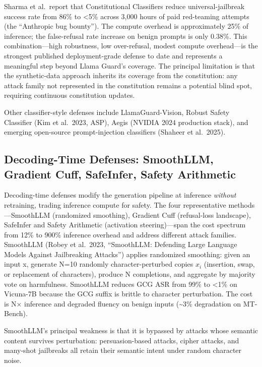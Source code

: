 Sharma et al.~report that Constitutional Classifiers reduce universal-jailbreak success rate from 86\% to \textless5\% across 3,000 hours of paid red-teaming attempts (the ``Anthropic bug bounty''). The compute overhead is approximately 25\% of inference; the false-refusal rate increase on benign prompts is only 0.38\%. This combination---high robustness, low over-refusal, modest compute overhead---is the strongest published deployment-grade defense to date and represents a meaningful step beyond Llama Guard's coverage. The principal limitation is that the synthetic-data approach inherits its coverage from the constitution: any attack family not represented in the constitution remains a potential blind spot, requiring continuous constitution updates.

Other classifier-style defenses include LlamaGuard-Vision, Robust Safety Classifier (Kim et al.~2023, ASP), Aegis (NVIDIA 2024 production stack), and emerging open-source prompt-injection classifiers (Shaheer et al.~2025).

\subsection{Decoding-Time Defenses: SmoothLLM, Gradient Cuff, SafeInfer, Safety Arithmetic}\label{decoding-time-defenses-smoothllm-gradient-cuff-safeinfer-safety-arithmetic}

Decoding-time defenses modify the generation pipeline at inference \emph{without} retraining, trading inference compute for safety. The four representative methods---SmoothLLM (randomized smoothing), Gradient Cuff (refusal-loss landscape), SafeInfer and Safety Arithmetic (activation steering)---span the cost spectrum from 12\% to 900\% inference overhead and address different attack families. SmoothLLM (Robey et al.~2023, ``SmoothLLM: Defending Large Language Models Against Jailbreaking Attacks'') applies randomized smoothing: given an input x, generate N=10 randomly character-perturbed copies \(x_i\) (insertion, swap, or replacement of characters), produce N completions, and aggregate by majority vote on harmfulness. SmoothLLM reduces GCG ASR from 99\% to \textless1\% on Vicuna-7B because the GCG suffix is brittle to character perturbation. The cost is N× inference and degraded fluency on benign inputs (\textasciitilde3\% degradation on MT-Bench).

SmoothLLM's principal weakness is that it is bypassed by attacks whose semantic content survives perturbation: persuasion-based attacks, cipher attacks, and many-shot jailbreaks all retain their semantic intent under random character noise.

